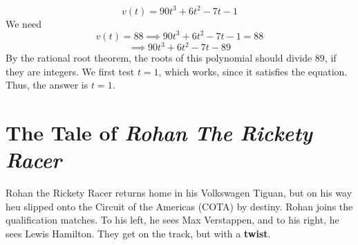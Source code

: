 \documentclass[a4paper]{article}
\begin{document}
\begin{enumerate}[itemsep=2cm]
    $$v(t) = 90t^3+6t^2-7t-1$$
    We need 
    \[v(t)=88\implies 90t^3+6t^2-7t-1=88\]
    \[\implies 90t^3+6t^2-7t-89\]
    By the rational root theorem, the roots of this polynomial should divide $89$, if they are integers. We first test $t=1$, which works, since it satisfies the equation. Thus, the answer is $t=\boxed{1}$.
    \end{enumerate}

    \newpage
    \section*{The Tale of \textit{Rohan The Rickety Racer}}
    
    Rohan the Rickety Racer returns home in his Volkswagen Tiguan, but on his way heu slipped onto the Circuit of the Americas (COTA) by destiny. Rohan joins the qualification matches. To his left, he sees Max Verstappen, and to his right, he sees Lewis Hamilton. They get on the track, but with a \textbf{twist}.
    
\end{document}
